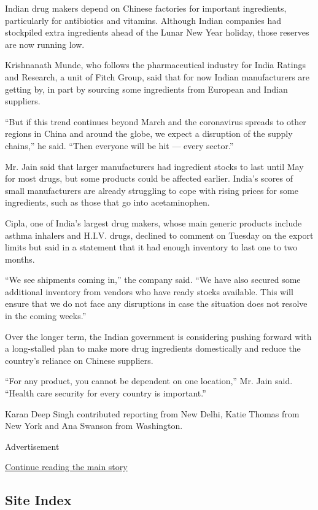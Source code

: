 Indian drug makers depend on Chinese factories for important
ingredients, particularly for antibiotics and vitamins. Although Indian
companies had stockpiled extra ingredients ahead of the Lunar New Year
holiday, those reserves are now running low.

Krishnanath Munde, who follows the pharmaceutical industry for India
Ratings and Research, a unit of Fitch Group, said that for now Indian
manufacturers are getting by, in part by sourcing some ingredients from
European and Indian suppliers.

``But if this trend continues beyond March and the coronavirus spreads
to other regions in China and around the globe, we expect a disruption
of the supply chains,'' he said. ``Then everyone will be hit --- every
sector.''

Mr. Jain said that larger manufacturers had ingredient stocks to last
until May for most drugs, but some products could be affected earlier.
India's scores of small manufacturers are already struggling to cope
with rising prices for some ingredients, such as those that go into
acetaminophen.

Cipla, one of India's largest drug makers, whose main generic products
include asthma inhalers and H.I.V. drugs, declined to comment on Tuesday
on the export limits but said in a statement that it had enough
inventory to last one to two months.

``We see shipments coming in,'' the company said. ``We have also secured
some additional inventory from vendors who have ready stocks available.
This will ensure that we do not face any disruptions in case the
situation does not resolve in the coming weeks.''

Over the longer term, the Indian government is considering pushing
forward with a long-stalled plan to make more drug ingredients
domestically and reduce the country's reliance on Chinese suppliers.

``For any product, you cannot be dependent on one location,'' Mr. Jain
said. ``Health care security for every country is important.''

Karan Deep Singh contributed reporting from New Delhi, Katie Thomas from
New York and Ana Swanson from Washington.

Advertisement

\protect\hyperlink{after-bottom}{Continue reading the main story}

\hypertarget{site-index}{%
\subsection{Site Index}\label{site-index}}

